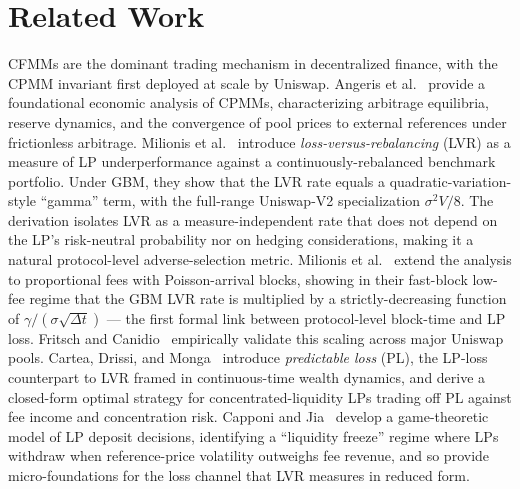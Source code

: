 \documentclass[runningheads]{llncs}
\newcommand{\dt}{\Delta t}
\newcommand{\1}{\mathbf{1}}
\begin{document}
\section{Related Work}\label{sec:related}

CFMMs are the dominant trading mechanism in decentralized finance, with the CPMM invariant first deployed at scale by Uniswap. Angeris et al.~\cite{angeris2020improved} provide a foundational economic analysis of CPMMs, characterizing arbitrage equilibria, reserve dynamics, and the convergence of pool prices to external references under frictionless arbitrage. Milionis et al.~\cite{milionis2022automated} introduce \emph{loss-versus-rebalancing} (LVR) as a measure of LP underperformance against a continuously-rebalanced benchmark portfolio. Under GBM, they show that the LVR rate equals a quadratic-variation-style ``gamma'' term, with the full-range Uniswap-V2 specialization $\sigma^2 V/8$. The derivation isolates LVR as a measure-independent rate that does not depend on the LP's risk-neutral probability nor on hedging considerations, making it a natural protocol-level adverse-selection metric. Milionis et al.~\cite{milionis2023automated} extend the analysis to proportional fees with Poisson-arrival blocks, showing in their fast-block low-fee regime that the GBM LVR rate is multiplied by a strictly-decreasing function of $\gamma/(\sigma\sqrt{\dt})$ --- the first formal link between protocol-level block-time and LP loss. Fritsch and Canidio~\cite{fritsch2024measuring} empirically validate this scaling across major Uniswap pools. Cartea, Drissi, and Monga~\cite{cartea2023predictable} introduce \emph{predictable loss} (PL), the LP-loss counterpart to LVR framed in continuous-time wealth dynamics, and derive a closed-form optimal strategy for concentrated-liquidity LPs trading off PL against fee income and concentration risk. Capponi and Jia~\cite{capponi2024price} develop a game-theoretic model of LP deposit decisions, identifying a ``liquidity freeze'' regime where LPs withdraw when reference-price volatility outweighs fee revenue, and so provide micro-foundations for the loss channel that LVR measures in reduced form.
\end{document}
